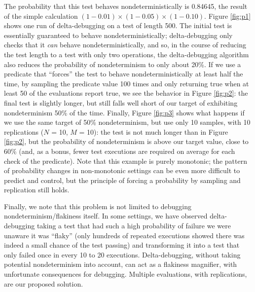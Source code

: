 The probability that this test behaves nondeterministically is
0.84645, the result of the simple calculation $(1-0.01) \times
(1-0.05) \times (1-0.10)$.  Figure \ref{fig:p1} shows one run of
delta-debugging on a test of length 500.  The initial test is
essentially guaranteed to behave nondeterministically; delta-debugging
only checks that it \emph{can} behave nondeterministically, and so, in
the course of reducing the test length to a test with only two
operations, the delta-debugging algorithm also reduces the probability
of nondeterminism to only about 20\%.  If we use a predicate that
``forces'' the test to behave nondeterministically at least half the
time, by sampling the predicate value 100 times and only returning
true when at least 50 of the evaluations report true, we see the
behavior in Figure \ref{fig:p2}:  the final test is slightly longer,
but still falls well short of our target of exhibiting nondeterminism
50\% of the time.  Finally, Figure \ref{fig:p3} shows what happens if
we use the same target of 50\% nondeterminism, but use only 10
samples, with 10 replications ($N$ = 10, $M$ = 10):  the test is not
much longer than in Figure \ref{fig:p2}, but the probability of
nondeterminism is above our target value, close to 60\% (and, as a bonus, fewer
test executions are required on average for each check of the predicate).  Note that
this example is purely monotonic; the pattern of probability changes
in non-monotonic settings can be even more difficult to predict and
control, but the principle of forcing a probability by sampling and
replication still holds.

Finally, we note that this problem is not limited to debugging
nondeterminism/flakiness itself.  In some settings, we have observed
delta-debugging taking a test that had such a high probability of
failure we were unaware it was ``flaky'' (only hundreds of repeated executions showed there was
indeed a small chance of the test passing) and transforming it into a
test that only failed once in every 10 to 20 executions.
Delta-debugging, without taking potential nondeterminism into account,
can act as a flakiness magnifier, with unfortunate consequences for
debugging.  Multiple evaluations, with replications, are our proposed solution.